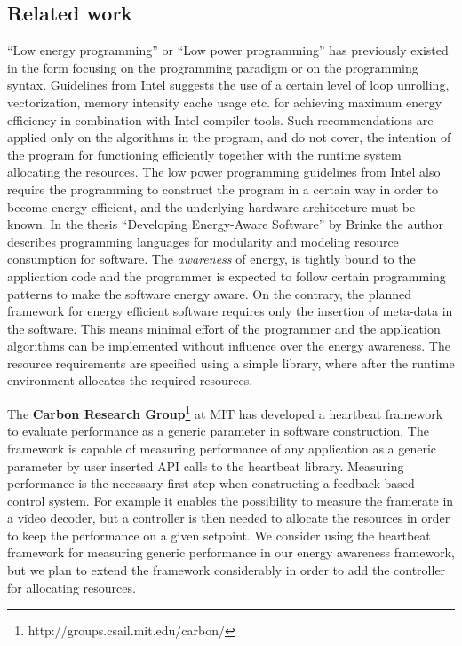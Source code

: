 \documentclass{article}
\begin{document}
\subsection{Related work}
``Low energy programming'' or ``Low power programming'' has previously existed in the form focusing on the programming paradigm or on the programming syntax. 
Guidelines from Intel \cite{IntelLowPower} suggests the use of a certain level of loop unrolling, vectorization, memory intensity cache usage etc.
for achieving maximum energy efficiency in combination with Intel compiler tools. 
Such recommendations are applied only on the algorithms in the program, and do not cover, the intention of the program for functioning efficiently together with the runtime system allocating the resources. 
The low power programming guidelines from Intel also require the programming to construct the program in a certain way in order to become energy efficient, 
and the underlying hardware architecture must be known. 
In the thesis ``Developing Energy-Aware Software'' by Brinke \cite{Brinke:15} the author describes programming languages for modularity and modeling resource consumption for software.
The \textit{awareness} of energy, is tightly bound to the application code and the programmer is expected to follow certain programming patterns to make the software energy aware.
On the contrary, the planned framework for energy efficient software requires only the insertion of meta-data in the software.
This means minimal effort of the programmer and the application algorithms can be implemented without influence over the energy awareness.
The resource requirements are specified using a simple library, where after the runtime environment allocates the required resources.

The \textbf{Carbon Research Group}\footnote{http://groups.csail.mit.edu/carbon/} at MIT has developed a heartbeat framework to evaluate performance as a generic parameter in software construction. The framework is capable of measuring performance of any application as a generic parameter by user inserted API calls to the heartbeat library. Measuring performance is the necessary first step when constructing a feedback-based control system. For example it enables the possibility to measure the framerate in a video decoder, but a controller is then needed to allocate the resources in order to keep the performance on a given setpoint. We consider using the heartbeat framework for measuring generic performance in our energy awareness framework, but we plan to extend the framework considerably in order to add the controller for allocating resources.\\
\end{document}
